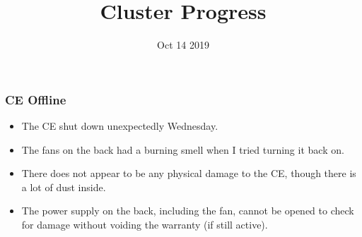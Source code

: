 \documentclass{beamer}
\title{Cluster Progress}
\date{Oct 14 2019}
\begin{document}

\begin{frame}
  \maketitle
\end{frame}


\begin{frame}
  \frametitle{CE Offline}

  \begin{itemize}
  \item The CE shut down unexpectedly Wednesday.
  \item The fans on the back had a burning smell when I tried turning it back on.
  \item There does not appear to be any physical damage to the CE, though there is a lot of dust inside.
  \item The power supply on the back, including the fan, cannot be opened to check for damage without voiding the warranty (if still active).
  \end{itemize}
\end{frame}
\end{document}
